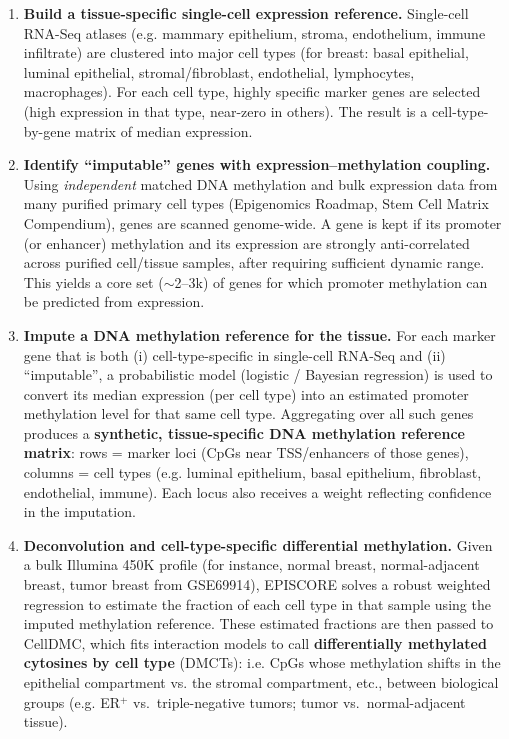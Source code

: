 \documentclass[10pt]{extarticle}
\begin{document}
\begin{enumerate}
    \item \textbf{Build a tissue-specific single-cell expression reference.}  
    Single-cell RNA-Seq atlases (e.g. mammary epithelium, stroma, endothelium, immune infiltrate) are clustered into major cell types (for breast: basal epithelial, luminal epithelial, stromal/fibroblast, endothelial, lymphocytes, macrophages). For each cell type, highly specific marker genes are selected (high expression in that type, near-zero in others). The result is a cell-type-by-gene matrix of median expression.
    \item \textbf{Identify ``imputable'' genes with expression--methylation coupling.}  
    Using \textit{independent} matched DNA methylation and bulk expression data from many purified primary cell types (Epigenomics Roadmap, Stem Cell Matrix Compendium), genes are scanned genome-wide. A gene is kept if its promoter (or enhancer) methylation and its expression are strongly anti-correlated across purified cell/tissue samples, after requiring sufficient dynamic range. This yields a core set ($\sim$2--3k) of genes for which promoter methylation can be predicted from expression.
    \item \textbf{Impute a DNA methylation reference for the tissue.}  
    For each marker gene that is both (i) cell-type-specific in single-cell RNA-Seq and (ii) “imputable”, a probabilistic model (logistic / Bayesian regression) is used to convert its median expression (per cell type) into an estimated promoter methylation level for that same cell type. Aggregating over all such genes produces a \textbf{synthetic, tissue-specific DNA methylation reference matrix}: rows = marker loci (CpGs near TSS/enhancers of those genes), columns = cell types (e.g. luminal epithelium, basal epithelium, fibroblast, endothelial, immune). Each locus also receives a weight reflecting confidence in the imputation.
    \item \textbf{Deconvolution and cell-type-specific differential methylation.}  
    Given a bulk Illumina 450K profile (for instance, normal breast, normal-adjacent breast, tumor breast from GSE69914), EPISCORE solves a robust weighted regression to estimate the fraction of each cell type in that sample using the imputed methylation reference.  
    These estimated fractions are then passed to CellDMC, which fits interaction models to call \textbf{differentially methylated cytosines by cell type} (DMCTs): i.e. CpGs whose methylation shifts in the epithelial compartment vs. the stromal compartment, etc., between biological groups (e.g. ER$^+$ vs.\ triple-negative tumors; tumor vs.\ normal-adjacent tissue).
\end{enumerate}
\end{document}

